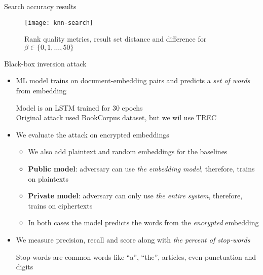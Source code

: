 	\begin{frame}{Search accuracy results}

		\begin{figure}[h]
			\centering
			\texttt{[image: knn-search]}
			\caption{Rank quality metrics, result set distance and difference for $\beta \in \{ 0, 1, \ldots , 50 \} $}
		\end{figure}

	\end{frame}

	\begin{frame}{Black-box inversion attack \cite{embedding-attacks}}

		\begin{itemize}
			\item<1->
				ML model trains on document-embedding pairs and predicts a \emph{set of words} from embedding \\
				\begin{small}
					\indent{} Model is an LSTM trained for 30 epochs \\
					\indent{} Original attack used BookCorpus \cite{bookcorpus} dataset, but we wil use TREC
				\end{small}

			\item<2->
				We evaluate the attack on encrypted embeddings
				\begin{itemize}
					\item We also add plaintext and random embeddings for the baselines
					\item \textbf{Public model}: adversary can use \emph{the embedding model}, therefore, trains on plaintexts
					\item \textbf{Private model}: adversary can only use \emph{the entire system}, therefore, trains on ciphertexts
					\item In both cases the model predicts the words from the \emph{encrypted} embedding
				\end{itemize}

			\item<3->
				We measure precision, recall and \FOne{} score along with \emph{the percent of stop-words} \\
				\begin{small}
					\indent{} Stop-words are common words like ``a'', ``the'', articles, even punctuation and digits
				\end{small}

		\end{itemize}

	\end{frame}

